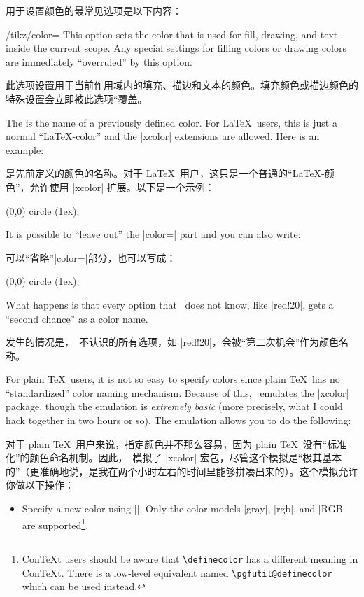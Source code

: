 用于设置颜色的最常见选项是以下内容：
%
\begin{key}{/tikz/color=}
    This option sets the color that is used for fill, drawing, and text inside
    the current scope. Any special settings for filling colors or drawing
    colors are immediately ``overruled'' by this option.

    此选项设置用于当前作用域内的填充、描边和文本的颜色。填充颜色或描边颜色的特殊设置会立即被此选项“覆盖。


    The  is the name of a previously defined color. For
    \LaTeX\ users, this is just a normal ``\LaTeX-color'' and the |xcolor|
    extensions are allowed. Here is an example:

     是先前定义的颜色的名称。对于 \LaTeX\ 用户，这只是一个普通的“\LaTeX-颜色”，允许使用 |xcolor| 扩展。以下是一个示例：

\begin{codeexample}[]
\tikz \fill[color=red!20] (0,0) circle (1ex);
\end{codeexample}

    It is possible to ``leave out'' the |color=| part and you can also write:
    
    可以“省略”|color=|部分，也可以写成：
%
\begin{codeexample}[]
\tikz \fill[red!20] (0,0) circle (1ex);
\end{codeexample}
    What happens is that every option that \tikzname\ does not know, like
    |red!20|, gets a ``second chance'' as a color name.

    发生的情况是，\tikzname\ 不认识的所有选项，如 |red!20|，会被“第二次机会”作为颜色名称。


    For plain \TeX\ users, it is not so easy to specify colors since plain
    \TeX\ has no ``standardized'' color naming mechanism. Because of this,
    \pgfname\ emulates the |xcolor| package, though the emulation is
    \emph{extremely basic} (more precisely, what I could hack together in two
    hours or so). The emulation allows you to do the following:
    
    对于 plain \TeX\ 用户来说，指定颜色并不那么容易，因为 plain \TeX\ 没有“标准化”的颜色命名机制。因此，\pgfname\ 模拟了 |xcolor| 宏包，尽管这个模拟是“极其基本的”（更准确地说，是我在两个小时左右的时间里能够拼凑出来的）。这个模拟允许你做以下操作：
%
    \begin{itemize}
        \item Specify a new color using |\definecolor|. Only the color models
            |gray|, |rgb|, and |RGB| are supported\footnote{Con\TeX t users
            should be aware that \texttt{\textbackslash definecolor} has a
            different meaning in Con\TeX t. There is a low-level equivalent
            named \texttt{\textbackslash pgfutil@definecolor} which can be
            used instead.}.


\end{itemize}
\end{key}
